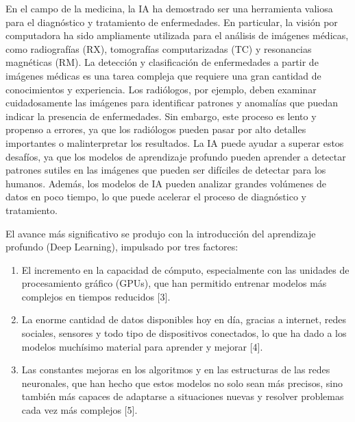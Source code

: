 En el campo de la medicina, la IA ha demostrado ser una herramienta valiosa para el diagnóstico y tratamiento de enfermedades. En particular, la visión por computadora ha sido ampliamente utilizada para el análisis de imágenes médicas, como radiografías (RX), tomografías computarizadas (TC) y resonancias magnéticas (RM). La detección y clasificación de enfermedades a partir de imágenes médicas es una tarea compleja que requiere una gran cantidad de conocimientos y experiencia. Los radiólogos, por ejemplo, deben examinar cuidadosamente las imágenes para identificar patrones y anomalías que puedan indicar la presencia de enfermedades. Sin embargo, este proceso es lento y propenso a errores, ya que los radiólogos pueden pasar por alto detalles importantes o malinterpretar los resultados. La IA puede ayudar a superar estos desafíos, ya que los modelos de aprendizaje profundo pueden aprender a detectar patrones sutiles en las imágenes que pueden ser difíciles de detectar para los humanos. Además, los modelos de IA pueden analizar grandes volúmenes de datos en poco tiempo, lo que puede acelerar el proceso de diagnóstico y tratamiento.

El avance más significativo se produjo con la introducción del aprendizaje profundo (Deep Learning), impulsado por tres factores:
\begin{enumerate}
    \item El incremento en la capacidad de cómputo, especialmente con las unidades de procesamiento gráfico (GPUs), que han permitido entrenar modelos más complejos en tiempos reducidos [3].
    \item La enorme cantidad de datos disponibles hoy en día, gracias a internet, redes sociales, sensores y todo tipo de dispositivos conectados, lo que ha dado a los modelos muchísimo material para aprender y mejorar [4].
    \item Las constantes mejoras en los algoritmos y en las estructuras de las redes neuronales, que han hecho que estos modelos no solo sean más precisos, sino también más capaces de adaptarse a situaciones nuevas y resolver problemas cada vez más complejos [5].
\end{enumerate}

